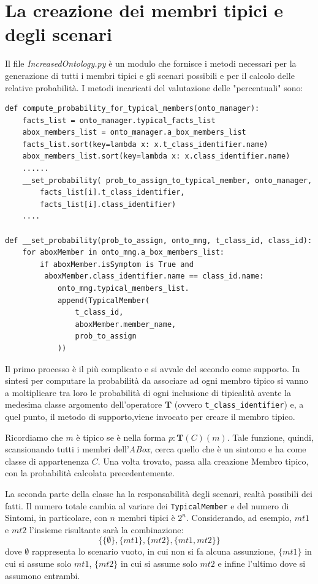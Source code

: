 \section{La creazione dei membri tipici e degli scenari}
Il file \emph{IncreasedOntology.py} è un modulo che fornisce i metodi necessari per la
generazione di tutti i membri tipici e gli scenari possibili e per il calcolo delle relative probabilità.
I metodi incaricati del valutazione delle "percentuali" sono:
\begin{verbatim}
def compute_probability_for_typical_members(onto_manager):
	facts_list = onto_manager.typical_facts_list
	abox_members_list = onto_manager.a_box_members_list
	facts_list.sort(key=lambda x: x.t_class_identifier.name)
	abox_members_list.sort(key=lambda x: x.class_identifier.name)
	......
    __set_probability( prob_to_assign_to_typical_member, onto_manager,
    	facts_list[i].t_class_identifier,
    	facts_list[i].class_identifier)
	....
	
def __set_probability(prob_to_assign, onto_mng, t_class_id, class_id):
	for aboxMember in onto_mng.a_box_members_list:
		if aboxMember.isSymptom is True and
		 aboxMember.class_identifier.name == class_id.name:
			onto_mng.typical_members_list.
			append(TypicalMember(
				t_class_id,
				aboxMember.member_name,
				prob_to_assign
			))
\end{verbatim}
Il primo processo è il più complicato e si avvale del secondo come supporto.
In sintesi per computare la probabilità da associare ad ogni membro tipico si 
vanno a moltiplicare tra loro le probabilità di ogni inclusione di tipicalità avente la
medesima classe argomento dell’operatore $ \mathbf{T} $
(ovvero \texttt{t_class_identifier}) e, a quel punto, il metodo
di supporto,viene invocato per creare il membro tipico.

Ricordiamo che $ m $ è tipico se è nella forma $ p:\mathbf{T}(C)(m) $.
Tale funzione, quindi, scansionando tutti i membri dell'\textit{ABox}, cerca quello che è un sintomo
e ha come classe di appartenenza $ C $. Una volta trovato, passa alla creazione Membro tipico, con la 
probabilità calcolata precedentemente.

La seconda parte della classe ha la responsabilità degli scenari, realtà possibili dei fatti.
Il numero totale cambia al variare dei \texttt{TypicalMember} e del numero di Sintomi,
in particolare, con $ n $ membri tipici è $ 2^{n} $. Considerando, ad esempio, $ mt1 $ e $ mt2 $
l'insieme risultante sarà la combinazione:
\[ \{\{\emptyset\},\{mt1\},\{mt2\},\{mt1,mt2\}\} \]
dove $ \emptyset $ rappresenta lo scenario vuoto, in cui non si fa alcuna assunzione, $ \{mt1\} $
in cui si assume solo $ mt1 $, $ \{mt2\} $ in cui si assume solo $ mt2 $ e infine l'ultimo 
dove si assumono entrambi.

